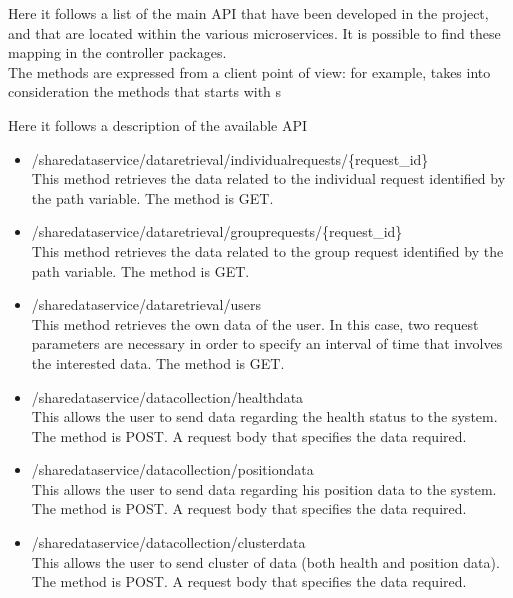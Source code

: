 Here it follows a list of the main API that have been developed in the project, and that are located
within the various microservices.
It is possible to find these mapping in the controller packages. \\
The methods are expressed from a client point of view: for example, takes into consideration the methods that starts with s 

Here it follows a description of the available API

\begin{itemize}
\item /sharedataservice/dataretrieval/individualrequests/\{request\_id\} \\
This method retrieves the data related to the individual request identified by the path variable. The method is GET.

\item /sharedataservice/dataretrieval/grouprequests/\{request\_id\} \\
This method retrieves the data related to the group request identified by the path variable. The method is GET.

\item /sharedataservice/dataretrieval/users \\
This method retrieves the own data of the user. In this case, two request parameters
are necessary in order to specify an interval of time that involves the interested data.
The method is GET.

\item /sharedataservice/datacollection/healthdata \\
This allows the user to send data regarding the health status to the system. The method is POST.
A request body that specifies the data required.

\item /sharedataservice/datacollection/positiondata \\
This allows the user to send data regarding his position data to the system. The method is POST.
A request body that specifies the data required.

\item /sharedataservice/datacollection/clusterdata \\
This allows the user to send cluster of data (both health and position data). The method is POST.
A request body that specifies the data required.

\end{itemize}



